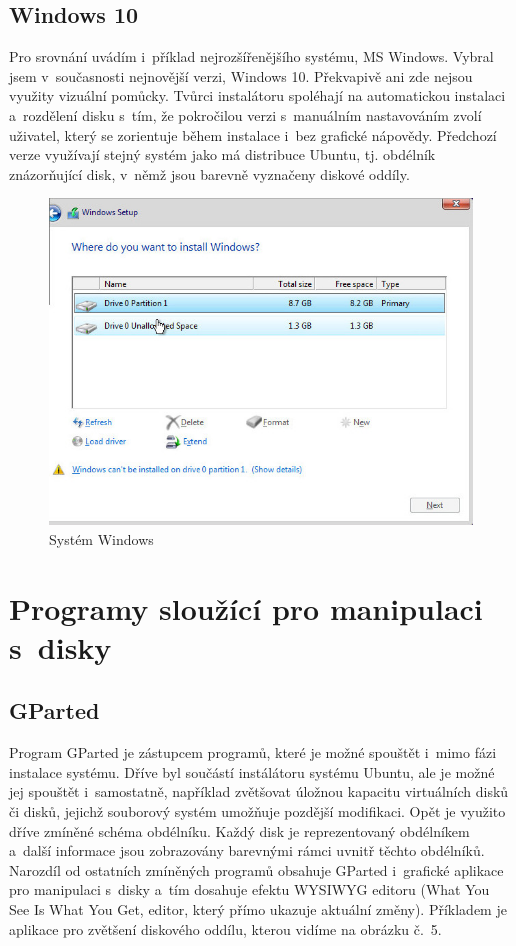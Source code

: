 \documentclass[color,table,oneside,nolot,nolof]{fithesis}
\begin{document}
\subsection{Windows 10}

Pro srovnání uvádím i~příklad nejrozšířenějšího systému, MS Windows. Vybral jsem v~současnosti nejnovější verzi, Windows 10. Překvapivě ani zde nejsou využity vizuální pomůcky.
Tvůrci instalátoru spoléhají na automatickou instalaci a~rozdělení disku s~tím, že pokročilou verzi s~manuálním nastavováním zvolí uživatel, který se zorientuje během instalace i~bez grafické nápovědy. 
Předchozí verze využívají stejný systém jako má distribuce Ubuntu, tj. obdélník znázorňující disk, v~němž jsou barevně vyznačeny diskové oddíly.

\begin{figure}[h!]
	\label{fig:win}
	\caption{Systém Windows}
	\centering
	\includegraphics[width=.6\columnwidth]{pictures/win1.jpg}
\end{figure}

\section{Programy sloužící pro manipulaci s~disky}

\subsection{GParted}

Program GParted je zástupcem programů, které je možné spouštět i~mimo fázi instalace systému. Dříve byl součástí instálátoru systému Ubuntu, ale je možné jej spouštět i~samostatně, například 
 zvětšovat úložnou kapacitu virtuálních disků či disků, jejichž souborový systém umožňuje pozdější modifikaci. Opět je využito dříve zmíněné schéma obdélníku. Každý disk je reprezentovaný 
 obdélníkem a~další informace jsou zobrazovány barevnými rámci uvnitř těchto obdélníků. Narozdíl od ostatních zmíněných programů obsahuje GParted i~grafické aplikace pro manipulaci s~disky 
 a~tím dosahuje efektu WYSIWYG editoru (What You See Is What You Get, editor, který přímo ukazuje aktuální změny). Příkladem je aplikace pro zvětšení diskového oddílu, kterou vidíme na obrázku č.~5.
\end{document}
